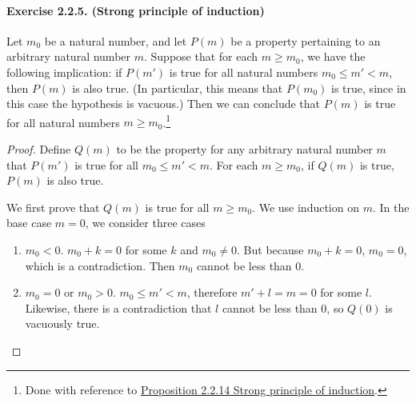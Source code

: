 \paragraph{Exercise 2.2.5. (Strong principle of induction)} Let $m_0$ be a natural number, and let $P(m)$ be a property pertaining to an arbitrary natural number $m$. Suppose that for each $m \geq m_0$, we have the following implication: if $P(m')$ is true for all natural numbers $m_0 \leq m' < m$, then $P(m)$ is also true. (In particular, this means that $P(m_0)$ is true, since in this case the hypothesis is vacuous.) Then we can conclude that $P(m)$ is true for all natural numbers $m \geq m_0$.\footnote{Done with reference to \href{https://zhuanlan.zhihu.com/p/70295136}{Proposition 2.2.14 Strong principle of induction}.}
\begin{proof}
    Define $Q(m)$ to be the property for any arbitrary natural number $m$ that $P(m')$ is true for all $m_0 \leq m' < m$. For each $m \geq m_0$, if $Q(m)$ is true, $P(m)$ is also true.

    We first prove that $Q(m)$ is true for all $m\geq m_0$. We use induction on $m$. In the base case $m=0$, we consider three cases
    \begin{enumerate}[label=(\arabic*)]
        \item $m_0<0$. $m_0+k=0$ for some $k$ and $m_0\neq 0$. But because $m_0+k=0$, $m_0=0$, which is a contradiction. Then $m_0$ cannot be less than $0$.
        \item $m_0=0$ or $m_0>0$. $m_0 \leq m' < m$, therefore $m'+l=m=0$ for some $l$. Likewise, there is a contradiction that $l$ cannot be less than $0$, so $Q(0)$ is vacuously true.
    \end{enumerate}


\end{proof}
